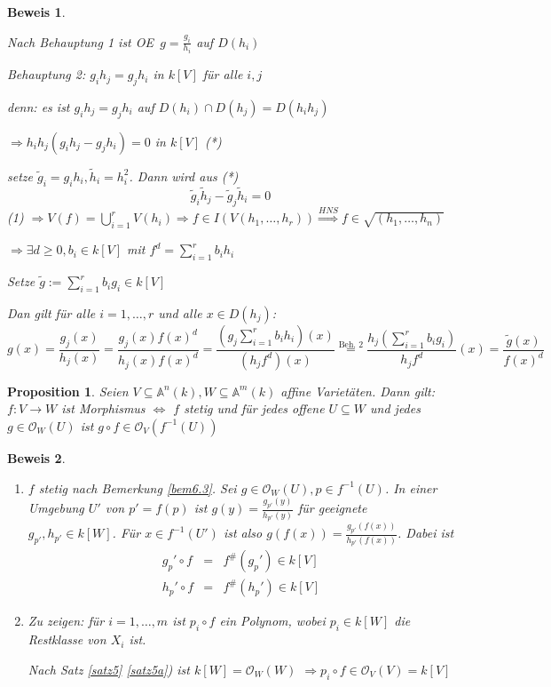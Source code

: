 \documentclass[a4paper, 12pt, numbers=noendperiod, chapterprefix=true]{scrbook}
\theoremstyle{break}
\newtheorem{Prop}[Def]{Proposition}
\theoremstyle{nonumberbreak}
\newtheorem{Bew}{Beweis}
\theoremstyle{nonumberplain}
\newcommand{\quot}[1]{\textrm{\glqq}{#1}\textrm{\grqq}}
\newenvironment{twosidedproof}{\begin{enumerate}[\quot{$\Rightarrow$}:]}{\end{enumerate}}
\newcommand{\proofforward}{\item[\quot{$\Rightarrow$}:]}
\newcommand{\proofreverse}{\item[\quot{$\Leftarrow$}:]}
\newcommand{\A}{\mathbb{A}}
\newcommand{\calO}{\mathcal{O}}
\renewcommand{\OE}{O\!\!E~}
\begin{document}
\begin{Bew}
\begin{enumerate}[a)]
\begin{description}[\setlabelstyle{\itshape}]
	Nach Behauptung 1 ist \OE $ g= \frac{g_i}{h_i}$ auf $D(h_i)$
	
	\emph{Behauptung 2:} $g_i h_j = g_j h_i$ in $k[V]$ f\"ur alle $i,j$
	
	\emph{denn:} es ist $g_ih_j = g_jh_i$ auf $D(h_i)\cap D(h_j)=D(h_ih_j)$
	
	$\Rightarrow h_ih_j(g_ih_j-g_jh_i)=0$ in $k[V]$ (*)
	
	setze $\tilde g_i = g_ih_i, \tilde h_i = h_i^2$. Dann wird aus (*)
		\[\tilde g_i \tilde h_j -\tilde g_j \tilde h_i =0\]
	(1) $\Rightarrow V(f) =\bigcup_{i=1}^r V(h_i) \Rightarrow f \in I(V(h_1,\dots ,h_r)) \stackrel{HNS}{\Rightarrow } f\in \sqrt{(h_1,\dots ,h_n)}$
	
	$\Rightarrow \exists d\geq 0, b_i\in k[V]$ mit $f^d=\sum_{i=1}^rb_ih_i$
	
	Setze $\tilde g := \sum_{i=1}^rb_ig_i\in k[V]$
	
	Dan gilt f\"ur alle $i=1,\dots ,r$ und alle $x\in D(h_j)$:
		\[g(x)=\frac{g_j(x)}{h_j(x)}=\frac{g_j(x)f(x)^d}{h_j(x)f(x)^d}=\frac{(g_j\sum_{i=1}^rb_ih_i)(x)}{(h_jf^d)(x)} \stackrel{\textrm{Beh. 2}}{=} \frac{h_j(\sum_{i=1}^rb_ig_i)}{h_jf^d}(x) = \frac{\tilde g(x)}{f(x)^d}\]
\end{description}
\end{enumerate}\end{Bew}

\begin{Prop}
Seien $V\subseteq\A^n(k), W\subseteq \A^m(k)$ affine Variet\"aten. Dann gilt: $f:V\to W$ ist Morphismus $\Leftrightarrow$ $f$ stetig und f\"ur jedes offene $U\subseteq W$ und jedes $g\in \calO_W(U)$ ist $g\circ f\in \calO_V(f^{-1}(U))$
\end{Prop}

\begin{Bew}\begin{twosidedproof}
\proofforward
	$f$ stetig nach Bemerkung \ref{bem6.3}. Sei $g\in \calO_W(U), p \in f^{-1}(U)$. In einer Umgebung $U'$ von $p'=f(p)$ ist $g(y)=\frac{g_{p'}(y)}{h_{p'}(y)}$ f\"ur geeignete $g_{p'}, h_{p'}\in k[W]$.	F\"ur $x\in f^{-1}(U')$ ist also $g(f(x))=\frac{g_{p'}(f(x))}{h_{p'}(f(x))}$. Dabei ist\[\begin{array}{lcr}
		g_p'\circ f & = & f^{\#}(g_p')\in k[V]\\
		h_p'\circ f & = & f^{\#}(h_p')\in k[V]\end{array}\]
\proofreverse
	Zu zeigen: f\"ur $i=1,\dots ,m$ ist $p_i\circ f$ ein Polynom, wobei $p_i\in k[W]$ die Restklasse von $X_i$ ist.
	
	Nach Satz \ref{satz5} \ref{satz5a}) ist $k[W] = \calO_W(W)$ $\Rightarrow p_i\circ f\in \calO_V(V)=k[V]$
\end{twosidedproof}\end{Bew}
\end{document}
